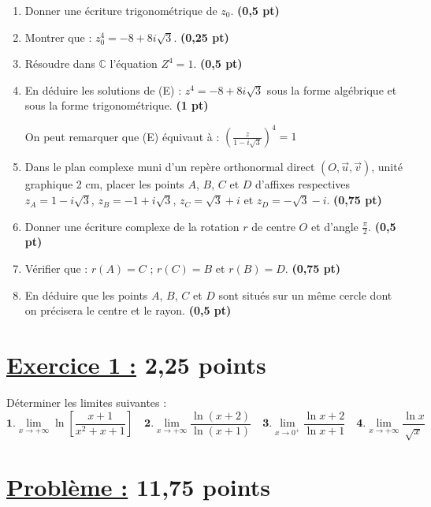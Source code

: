 \documentclass[12pt,a4paper]{article}
\begin{document}
\begin{enumerate}
    \item Donner une écriture trigonométrique de $z_0$. \hfill \textbf{(0,5 pt)}
    \item Montrer que : $z_0^4 = -8 + 8i\sqrt{3}$. \hfill \textbf{(0,25 pt)}
    \item Résoudre dans $\mathbb{C}$ l’équation $Z^4 = 1$. \hfill \textbf{(0,5 pt)}
    \item En déduire les solutions de (E) : $z^4 = -8 + 8i\sqrt{3}$ sous la forme algébrique et sous la forme trigonométrique. \hfill \textbf{(1 pt)}
    
    \medskip
    On peut remarquer que (E) équivaut à :
$\left( \frac{z}{1 - i\sqrt{3}} \right)^4 = 1$
    \item Dans le plan complexe muni d’un repère orthonormal direct $(O, \vec{u}, \vec{v})$, unité graphique 2 cm, placer les points $A$, $B$, $C$ et $D$ d’affixes respectives $z_A = 1 - i\sqrt{3}$, $z_B = -1 + i\sqrt{3}$, $z_C = \sqrt{3} + i$ et $z_D = -\sqrt{3} - i$. \hfill \textbf{(0,75 pt)}
    
    \item Donner une écriture complexe de la rotation $r$ de centre $O$ et d’angle $\frac{\pi}{2}$. \hfill \textbf{(0,5 pt)}
    
    \item Vérifier que : $r(A) = C$ ; $r(C) = B$ et $r(B) = D$. \hfill \textbf{(0,75 pt)}
    
    \item En déduire que les points $A$, $B$, $C$ et $D$ sont situés sur un même cercle dont on précisera le centre et le rayon. \hfill \textbf{(0,5 pt)}
\end{enumerate}

\section*{\underline{Exercice 1 :} 2,25 points }
Déterminer les limites suivantes :
\[
\textbf{1.} \lim\limits_{x \to +\infty} \ln\left[ \frac{x+1}{x^2 + x + 1}\right]  \quad 
\textbf{2.} \lim\limits_{x \to +\infty} \frac{\ln(x+2)}{\ln(x+1)} \quad 
\textbf{3.} \lim\limits_{x \to 0^+} \frac{\ln x+2}{\ln x+1} \quad
\textbf{4.} \lim\limits_{x \to +\infty} \frac{\ln x}{\sqrt{x}}
\]

\section*{\underline{Problème :} 11,75 points }
\end{document}
